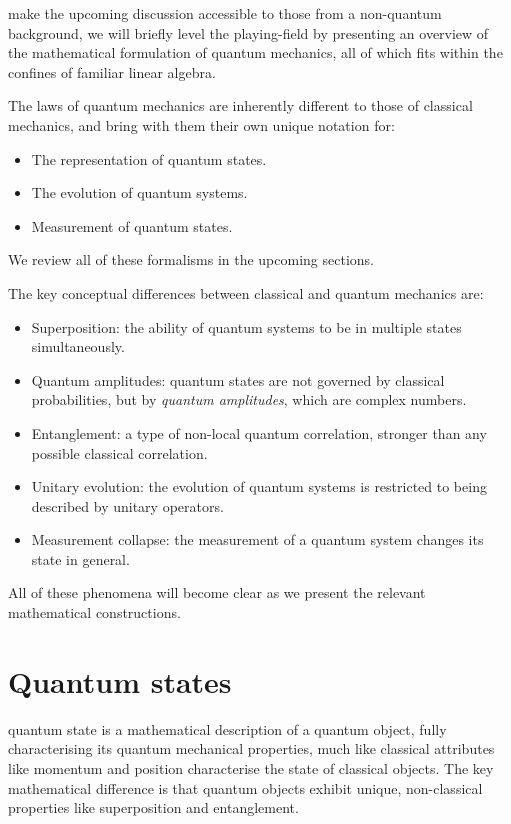  make the upcoming discussion accessible to those from a non-quantum background, we will briefly level the playing-field by presenting an overview of the mathematical formulation of quantum mechanics, all of which fits within the confines of familiar linear algebra.

The laws of quantum mechanics are inherently different to those of classical mechanics, and bring with them their own unique notation for:
\begin{itemize}
	\item The representation of quantum states.
	\item The evolution of quantum systems.
	\item Measurement of quantum states.
\end{itemize}
We review all of these formalisms in the upcoming sections.

The key conceptual differences between classical and quantum mechanics are:
\begin{itemize}
	\item Superposition: the ability of quantum systems to be in multiple states simultaneously.
	\item Quantum amplitudes: quantum states are not governed by classical probabilities, but by \textit{quantum amplitudes}, which are complex numbers.
	\item Entanglement: a type of non-local quantum correlation, stronger than any possible classical correlation.
	\item Unitary evolution: the evolution of quantum systems is restricted to being described by unitary operators.
	\item Measurement collapse: the measurement of a quantum system changes its state in general.
\end{itemize}
All of these phenomena will become clear as we present the relevant mathematical constructions.

%
%

\section{Quantum states}

 quantum state is a mathematical description of a quantum object, fully characterising its quantum mechanical properties, much like classical attributes like momentum and position characterise the state of classical objects. The key mathematical difference is that quantum objects exhibit unique, non-classical properties like superposition and entanglement.

